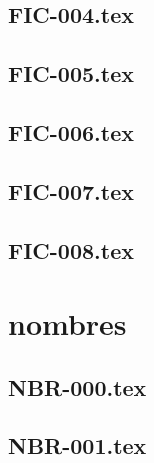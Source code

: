 \renewcommand{\xxexo}{FIC-004.tex} 
\subsection*{\xxexo} 
\graphicspath{{../../exos/fichiers/FIC-004/}}
 
 
\renewcommand{\xxexo}{FIC-005.tex} 
\subsection*{\xxexo} 
\graphicspath{{../../exos/fichiers/FIC-005/}}
 
 
\renewcommand{\xxexo}{FIC-006.tex} 
\subsection*{\xxexo} 
\graphicspath{{../../exos/fichiers/FIC-006/}}
 
 
\renewcommand{\xxexo}{FIC-007.tex} 
\subsection*{\xxexo} 
\graphicspath{{../../exos/fichiers/FIC-007/}}
 
 
\renewcommand{\xxexo}{FIC-008.tex} 
\subsection*{\xxexo} 
\graphicspath{{../../exos/fichiers/FIC-008/}}
 
 
\section*{nombres}
\renewcommand{\xxexo}{NBR-000.tex} 
\subsection*{\xxexo} 
\graphicspath{{../../exos/nombres/NBR-000/}}
 
 
\renewcommand{\xxexo}{NBR-001.tex} 
\subsection*{\xxexo} 
\graphicspath{{../../exos/nombres/NBR-001/}}
 
 
\renewcommand{\xxexo}{NBR-002.tex} 
